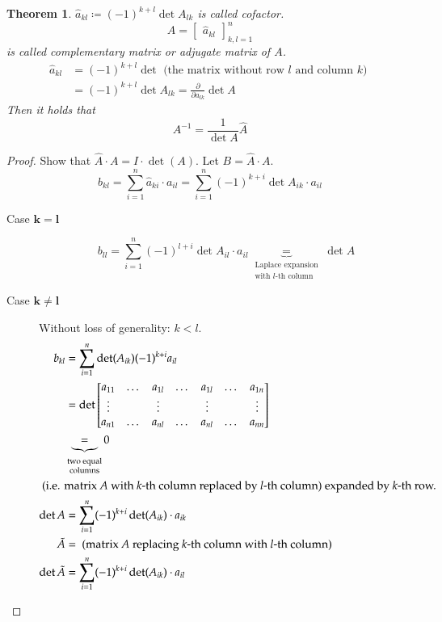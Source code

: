 \documentclass{article}
\newcounter{lecref}[section]
\numberwithin{lecref}{section}
\newtheorem{theorem}[lecref]{Theorem}
\begin{document}
\begin{theorem} %
  $\hat{a}_{kl} \coloneqq (-1)^{k+l} \det{A_{lk}}$ is called \emph{cofactor}.
  \[ \hat{A} = \begin{bmatrix} \hat{a}_{kl} \end{bmatrix}_{k,l=1}^n \]
  is called \emph{complementary matrix} or \emph{adjugate matrix} of $A$.
  \begin{align*}
    \hat{a}_{kl}
    &= (-1)^{k+l} \det \text{ (the matrix without row $l$ and column $k$) } \\
    &= (-1)^{k+l} \det{A_{lk}} = \frac{\partial}{\partial a_{lk}} \det{A}
  \end{align*}
  Then it holds that
  \[ A^{-1} = \frac{1}{\det{A}} \hat{A} \]
\end{theorem}

\begin{proof}
  Show that $\hat{A} \cdot A = I \cdot \det(A)$.
  Let $B = \hat{A} \cdot A$.
  \[ b_{kl} = \sum_{i=1}^n \hat{a}_{ki} \cdot a_{il} = \sum_{i=1}^n (-1)^{k+i} \det{A_{ik}} \cdot a_{il} \]
  \begin{description}
    \item[Case $\mathbf{k=l}$]
      \[
        b_{ll} = \sum_{i=1}^n (-1)^{l+i} \det{A_{il}} \cdot a_{il}
          \underbrace{=}_{\substack{\text{Laplace expansion} \\ \text{with $l$-th column}}} \det{A}
      \]
    \item[Case $\mathbf{k \neq l}$] Without loss of generality: $k < l$.
      \begin{align*}
        b_{kl} &= \sum_{i=1}^n \det(A_{ik}) (-1)^{k+i} a_{il} \\
               &= \det\begin{bmatrix}
                 a_{11} & \dots & a_{1l} & \dots & a_{1l} & \dots & a_{1n} \\
                 \vdots &       & \vdots &       & \vdots &       & \vdots \\
                 a_{n1} & \dots & a_{nl} & \dots & a_{nl} & \dots & a_{nn}
               \end{bmatrix} \\
               &\underbrace{=}_{\substack{\text{two equal} \\ \text{columns}}} 0 \\
        \intertext{
          (i.e. matrix $A$ with $k$-th column replaced by $l$-th column)
          expanded by $k$-th row.
        }
        \det{A} &= \sum_{i=1}^n (-1)^{k+i} \det(A_{ik}) \cdot a_{ik} \\
        \tilde{A} &= \text{ (matrix $A$ replacing $k$-th column with $l$-th column)} \\
        \det{\tilde{A}} &= \sum_{i=1}^n (-1)^{k+i} \det(A_{ik}) \cdot a_{il}
      \end{align*}
  \end{description}
\end{proof}
\end{document}
